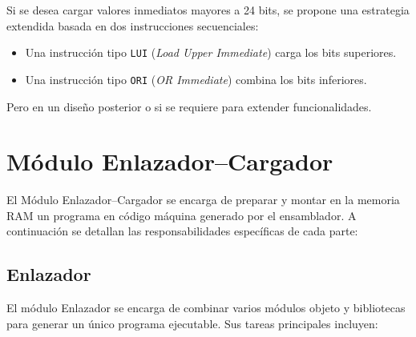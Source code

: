 \documentclass{article}
\begin{document}
Si se desea cargar valores inmediatos mayores a 24 bits, se propone una
estrategia extendida basada en dos instrucciones secuenciales:

\begin{itemize}
  \item Una instrucción tipo \texttt{LUI} (\textit{Load Upper Immediate}) carga los bits superiores.
  \item Una instrucción tipo \texttt{ORI} (\textit{OR Immediate}) combina los bits inferiores.
\end{itemize}

Pero en un diseño posterior o si se requiere para extender funcionalidades.




\section{Módulo Enlazador–Cargador}

El Módulo Enlazador–Cargador se encarga de preparar y montar en la memoria RAM un programa en código máquina generado por el ensamblador. A continuación se detallan las responsabilidades específicas de cada parte:
\subsection{Enlazador}

El módulo Enlazador se encarga de combinar varios módulos objeto y bibliotecas para generar un único programa ejecutable. Sus tareas principales incluyen:
\end{document}
